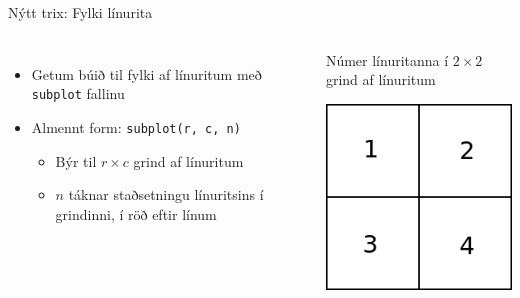 \documentclass{beamer}
\begin{document}
\begin{frame}{Nýtt trix: Fylki línurita}
\begin{columns}
\begin{itemize}
 \item Getum búið til fylki af línuritum með \texttt{subplot} fallinu
 \item Almennt form: \texttt{subplot(r, c, n)}
 \begin{itemize}
  \item Býr til $r \times c$ grind af línuritum
  \item $n$ táknar staðsetningu línuritsins í grindinni, í röð eftir línum
 \end{itemize}
\end{itemize}
\begin{center}
Númer línuritanna í $2 \times 2$ grind af línuritum

\includegraphics[width=0.8\linewidth]{Pics/subplotgrid}
\end{center}
\end{columns}
\end{frame}
\end{document}
